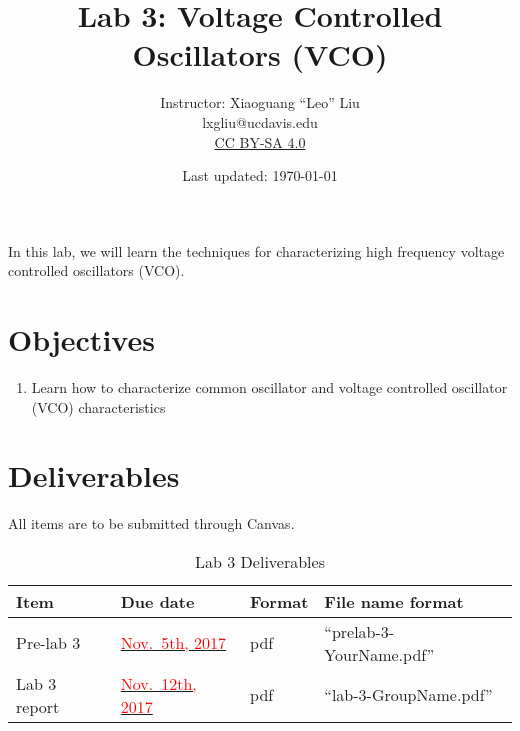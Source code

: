 \documentclass[letterpaper, 11pt]{article}
\newcommand{\due}[1]{\href{https://github.com/ucdart/UCD-EEC134/blob/master/support/schedule/eec134-schedule.pdf}{\textcolor{red}{#1}}}
\begin{document}
\title{Lab 3: Voltage Controlled Oscillators (VCO)}
\author{Instructor: Xiaoguang ``Leo'' Liu\\lxgliu@ucdavis.edu \\
	\small \href{http://creativecommons.org/licenses/by-sa/4.0/}{CC BY-SA 4.0}}
\date{Last updated: \today}

\maketitle

In this lab, we will learn the techniques for characterizing high frequency voltage controlled oscillators (VCO). 

\section{Objectives}

\begin{enumerate}[itemsep=0.1ex]
	\item Learn how to characterize common oscillator and voltage controlled oscillator (VCO) characteristics	
\end{enumerate}



\section{Deliverables}
All items are to be submitted through Canvas.  

\vspace{0.5cm}

\begin{table}[h]
	\footnotesize
	\caption{Lab 3 Deliverables}
	\renewcommand{\arraystretch}{1.2}
	\begin{tabular}{|m{1in}|l|m{0.45in}|m{2in}|}
		\hline
		\textbf{Item} & \textbf{Due date} & \textbf{Format} & \textbf{File name format} \\
		\hline \hline
		Pre-lab 3 & \due{Nov.~5th, 2017} & pdf & ``prelab-3-YourName.pdf'' \\
		\hline
		Lab 3 report & \due{Nov.~12th, 2017} & pdf & ``lab-3-GroupName.pdf''\\
		\hline
	\end{tabular}
\end{table}
\end{document}
